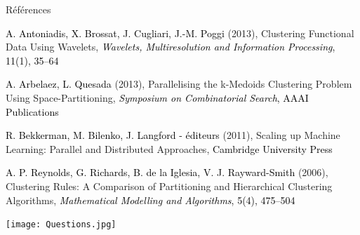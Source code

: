 \begin{frame}{Références}

\begin{thebibliography}{4}
 \textcolor{black}{A. Antoniadis, X. Brossat, J. Cugliari, J.-M. Poggi} (2013), Clustering Functional Data Using Wavelets, \textcolor{black}{{\it Wavelets, Multiresolution and Information Processing}, 11(1), 35--64}

 \textcolor{black}{A. Arbelaez, L. Quesada} (2013), Parallelising the k-Medoids Clustering Problem Using Space-Partitioning, \textcolor{black}{{\it Symposium on Combinatorial Search}, AAAI Publications}

 \textcolor{black}{R. Bekkerman, M. Bilenko, J. Langford - éditeurs} (2011), 
Scaling up Machine Learning: Parallel and Distributed Approaches, \textcolor{black}{Cambridge University Press}

 \textcolor{black}{A. P. Reynolds, G. Richards, B. de la Iglesia, V. J. Rayward-Smith} (2006), Clustering Rules: A Comparison of Partitioning and Hierarchical Clustering Algorithms, \textcolor{black}{{\it Mathematical Modelling and Algorithms}, 5(4), 475--504}




\end{thebibliography}



\end{frame}

\begin{frame}

\centering
\texttt{[image: Questions.jpg]}

\end{frame}



